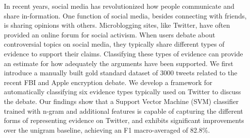 In recent years, social media has revolutionized how people communicate and share in-formation. One function of social media, besides connecting with friends, is sharing opinions with others. Microblogging sites, like Twitter, have often provided an online forum for social activism. When users debate about controversial topics on social media, they typically share different types of evidence to support their claims. Classifying these types of evidence can provide an estimate for how adequately the arguments have been supported. We first introduce a manually built gold standard dataset of 3000 tweets related to the recent FBI and Apple encryption debate. We develop a framework for automatically classifying six evidence types typically used on Twitter to discuss the debate. Our findings show that a Support Vector Machine (SVM) classifier trained with n-gram and additional features is capable of capturing the different forms of representing evidence on Twitter, and exhibits significant improvements over the unigram baseline, achieving an F1 macro-averaged of 82.8\%.
